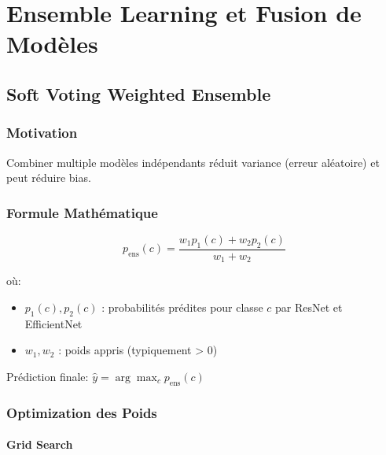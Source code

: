 \documentclass[12pt,a4paper,oneside]{report}
\begin{document}
\newpage


\chapter{Ensemble Learning et Fusion de Modèles}

\section{Soft Voting Weighted Ensemble}

\subsection{Motivation}

Combiner multiple modèles indépendants réduit variance (erreur aléatoire) 
et peut réduire bias.

\subsection{Formule Mathématique}

\begin{equation}
p_{\text{ens}}(c) = \frac{w_1 p_1(c) + w_2 p_2(c)}{w_1 + w_2}
\label{eq:soft_voting_weights}
\end{equation}

où:
\begin{itemize}
    \item $p_1(c), p_2(c)$ : probabilités prédites pour classe $c$ 
          par ResNet et EfficientNet
    \item $w_1, w_2$ : poids appris (typiquement > 0)
\end{itemize}

Prédiction finale: $\hat{y} = \arg\max_c p_{\text{ens}}(c)$

\subsection{Optimization des Poids}

\subsubsection{Grid Search}
\end{document}
